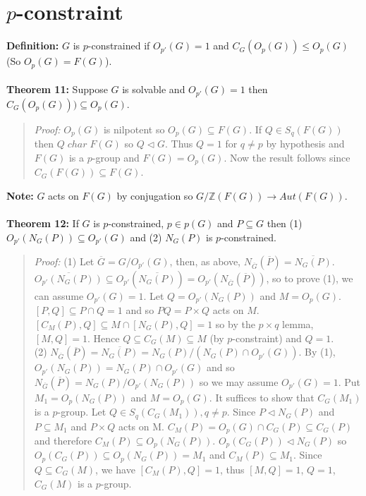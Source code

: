 \section {$p$-constraint}
{\bf Definition:} $G$ is $p$-constrained if $O_{p'}(G)=1$ and $C_G(O_p(G)) \leq O_p(G)$ (So
$O_p(G)=F(G)$).
\\
\\
{\bf Theorem 11:}
Suppose $G$ is solvable and $O_{p'}(G)=1$ then $C_G(O_p(G))) \subseteq O_p(G)$.
\begin{quote}
\emph{Proof:}
$O_p(G)$ is nilpotent so $O_p(G) \subseteq F(G)$.  If $Q \in S_q(F(G))$ then
$Q \; char \; F(G)$ so $Q \lhd G$.  Thus $Q=1$ for $q \ne p$ by hypothesis and
$F(G)$ is a $p$-group and $F(G)=O_p(G)$.  Now the result follows since $C_G(F(G)) \subseteq F(G)$.
\end{quote}
{\bf Note:} $G$ acts on $F(G)$ by conjugation so $G/{\mathbb Z}(F(G)) \rightarrow Aut(F(G))$.
\\
\\
{\bf Theorem 12:}  If $G$ is $p$-constrained, $p \in p(G)$ and $P \subseteq G$ then
(1) $O_{p'}(N_G(P)) \subseteq O_{p'}(G)$ and (2) $N_G(P)$ is $p$-constrained.
\begin{quote}
\emph{Proof:}  (1) Let ${\overline G}= G/O_{p'}(G)$, then, as above,
$N_{{\overline G}}({\overline P}) = {\overline {N_G(P)}}$.
${\overline {O_{p'}(N_G(P))}} \subseteq O_{p'}({\overline {N_G(P)}}) = O_{p'}(N_{\overline G}({\overline P}))$, so to prove (1), we can assume $O_{p'}(G) = 1$.
Let $Q= O_{p'}(N_G(P))$ and $M= O_p(G)$.  $[P, Q] \subseteq P \cap Q = 1$ and so
$PQ= P \times Q$ acts on $M$.  $[C_M(P),Q] \subseteq M \cap [N_G(P), Q] = 1$ so
by the $p \times q$ lemma, $[M, Q] = 1$.   Hence
$Q \subseteq C_G(M) \subseteq M$ (by $p$-constraint) and $Q = 1$.
\\
(2)
$N_{{\overline G}}({\overline P}) = {\overline {N_G(P)}}= N_G(P)/(N_G(P) \cap O_{p'}(G))$.
By (1), $O_{p'}(N_G(P)) = N_G(P) \cap O_{p'}(G)$ and so
$N_{\overline G}({\overline P})= N_G(P)/O_{p'}(N_G(P))$ so we
may assume $O_{p'}(G) = 1$.
Put $M_1 = O_p(N_G(P))$ and $M=O_p(G)$.  It suffices to show that $C_G(M_1 )$ is a $p$-group.
Let $Q \in S_q(C_G(M_1 )), q \ne p$.  Since $P \lhd N_G(P)$ and $P \subseteq M_1$ and
$P \times Q$ acts on M.  $C_M(P)= O_p(G) \cap C_G(P) \subseteq C_G(P)$ and therefore
$C_M(P) \subseteq O_p (N_G(P))$.  $O_p (C_G(P)) \lhd N_G(P)$ so
$O_p(C_G(P)) \subseteq O_p(N_G(P))= M_1$ and $C_M(P) \subseteq M_1$.  Since
$Q \subseteq C_G(M)$, we have $[C_M(P), Q] = 1$, thus $[M, Q]= 1 $, $Q = 1$, $C_G(M)$ is
a $p$-group.
\end{quote}
